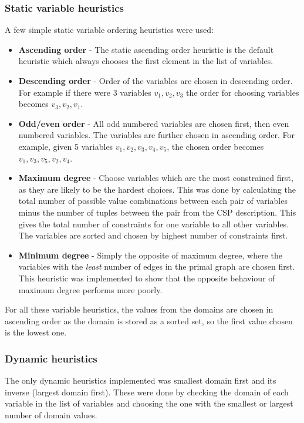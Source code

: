 \documentclass{article}
\begin{document}
\subsubsection{Static variable heuristics}
A few simple static variable ordering heuristics were used:
\begin{itemize}
\item \textbf{Ascending order} - The static ascending order heuristic is the default heuristic which always chooses the first element in the list of variables. 
\item \textbf{Descending order} - Order of the variables are chosen in descending order. For example if there were 3 variables $v_{1}, v_{2}, v_{3}$ the order for choosing variables becomes $v_{3}, v_{2}, v_{1}$. 
\item \textbf{Odd/even order} - All odd numbered variables are chosen first, then even numbered variables. The variables are further chosen in ascending order. For example, given 5 variables $v_{1}, v_2, v_3, v_4, v_5$, the chosen order becomes $v_1, v_3, v_5, v_2, v_4$. 
\item \textbf{Maximum degree} - Choose variables which are the most constrained first, as they are likely to be the hardest choices. This was done by calculating the total number of possible value combinations between each pair of variables minus the number of tuples between the pair from the CSP description. This gives the total number of constraints for one variable to all other variables. The variables are sorted and chosen by highest number of constraints first. 
\item \textbf{Minimum degree} - Simply the opposite of maximum degree, where the variables with the \textit{least} number of edges in the primal graph are chosen first. This heuristic was implemented to show that the opposite behaviour of maximum degree performs more poorly.
\end{itemize}
For all these variable heuristics, the values from the domains are chosen in ascending order as the domain is stored as a sorted set, so the first value chosen is the lowest one. 

\subsubsection{Dynamic heuristics}
The only dynamic heuristics implemented was smallest domain first and its inverse (largest domain first). These were done by checking the domain of each variable in the list of variables and choosing the one with the smallest or largest number of domain values. 
\end{document}
